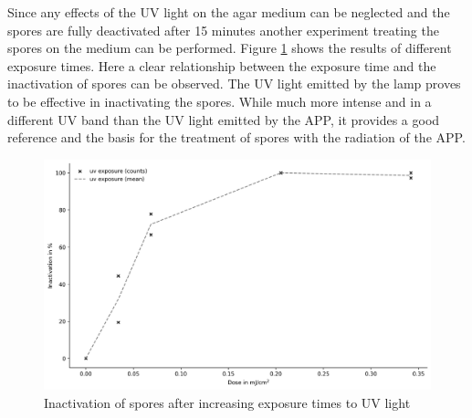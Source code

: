 Since any effects of the UV light on the agar medium can be neglected and the spores are fully deactivated after 15 minutes another experiment treating the spores on the medium can be performed. Figure \ref{fig:uv_time} shows the results of different exposure times. Here a clear relationship between the exposure time and the inactivation of spores can be observed. The UV light emitted by the lamp proves to be effective in inactivating the spores. While much more intense and in a different UV band than the UV light emitted by the APP, it provides a good reference and the basis for the treatment of spores with the radiation of the APP.

\begin{figure}
    \centering
    \includegraphics[width=1\textwidth]{images/UV.png}
    \caption[Inactivation of spores after increasing exposure times to UV light]{Inactivation of spores after increasing exposure times to UV light}
    \label{fig:uv_time}
\end{figure}

